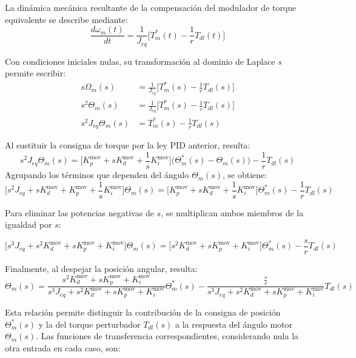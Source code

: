 \documentclass[blue,fullpaper]{ludusofficial}  %
\begin{document}
La dinámica mecánica resultante de la compensación del modulador de torque equivalente se describe mediante:
\[
\frac{d\omega_{m}(t)}{dt} = \frac{1}{J_{eq}} \Big[ T_{m}^{*}(t)- \frac{1}{r} T_{dl}(t) \Big]
\]

Con condiciones iniciales nulas, su transformación al dominio de Laplace $s$ permite escribir:
\begin{align*}
s\Omega_{m}(s)  & = \frac{1}{J_{eq}} \Big[ T_{m}^{*}(s)- \frac{1}{r} T_{dl}(s) \Big] \\ 
s^{2}\Theta_{m}(s)  & = \frac{1}{J_{eq}} \Big[ T_{m}^{*}(s)- \frac{1}{r} T_{dl}(s) \Big] \\
s^{2}J_{eq} \Theta_{m}(s)  & = T_{m}^{*}(s)- \frac{1}{r} T_{dl}(s) 
\end{align*}

Al sustituir la consigna de torque por la ley PID anterior, %
resulta:
\[
s^{2}J_{eq} \Theta_{m}(s) = \Big[  K_{p}^{\text{mov}} + sK_{d}^{\text{mov}} + \frac{1}{s}K_{i}^{\text{mov}} \Big] \Big( \Theta^{*}_{m}(s) - \Theta_{m}(s) \Big) - \frac{1}{r} T_{dl}(s) 
\]
Agrupando los términos que dependen del ángulo $\Theta_m(s)$, se obtiene:
\[
\Big[ s^{2}J_{eq} + sK_{d}^{\text{mov}} + K_{p}^{\text{mov}}  + \frac{1}{s}K_{i}^{\text{mov}} \Big] \Theta_{m}(s) = \Big[  K_{p}^{\text{mov}} + sK_{d}^{\text{mov}} + \frac{1}{s}K_{i}^{\text{mov}} \Big] \Theta^{*}_{m}(s) - \frac{1}{r} T_{dl}(s) 
\]

Para eliminar las potencias negativas de $s$, se multiplican ambos miembros de la igualdad por $s$:

\[
\Big[ s^{3}J_{eq} + s^{2}K_{d}^{\text{mov}} + sK_{p}^{\text{mov}}  + K_{i}^{\text{mov}} \Big] \Theta_{m}(s) = \Big[  s^{2}K_{d}^{\text{mov}} + sK_{p}^{\text{mov}} + K_{i}^{\text{mov}} \Big] \Theta^{*}_{m}(s) - \frac{s}{r} T_{dl}(s) 
\]

Finalmente, al despejar la posición angular, resulta:
\[
\Theta_{m}(s) = \frac{  s^{2}K_{d}^{\text{mov}} + sK_{p}^{\text{mov}} + K_{i}^{\text{mov}} }{ s^{3}J_{eq} + s^{2}K_{d}^{\text{mov}} + sK_{p}^{\text{mov}}  + K_{i}^{\text{mov}} } \Theta^{*}_{m}(s) - \frac{\frac{s}{r}}{ s^{3}J_{eq} + s^{2}K_{d}^{\text{mov}} + sK_{p}^{\text{mov}}  + K_{i}^{\text{mov}} } T_{dl}(s) 
\]

Esta relación permite distinguir la contribución de la consigna de posición $\Theta_{m}^{*}(s)$ y la del torque perturbador $T_{dl}(s)$ a la respuesta del ángulo motor $\Theta_{m}(s)$. Las funciones de transferencia correspondientes, considerando nula la otra entrada en cada caso, son:
\end{document}
